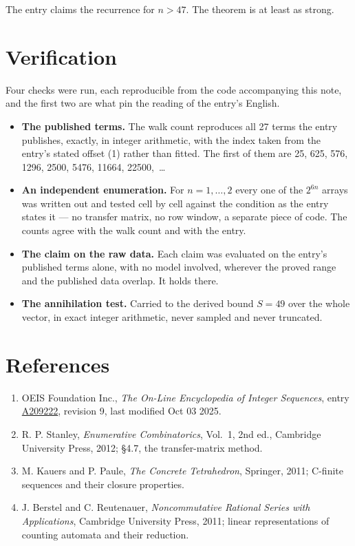 \documentclass[11pt]{article}
\theoremstyle{definition}
\begin{document}
The entry claims the recurrence for $n > 47$. The theorem is at least as strong.

\section{Verification}

Four checks were run, each reproducible from the code accompanying this note, and the first two are what pin the reading of the entry's English.

\begin{itemize}

\item {\bfseries The published terms.} The walk count reproduces all 27 terms the entry publishes, exactly, in integer arithmetic, with the index taken from the entry's stated offset (1) rather than fitted. The first of them are 25, 625, 576, 1296, 2500, 5476, 11664, 22500,~\dots

\item {\bfseries An independent enumeration.} For $n = 1,\dots,2$ every one of the $2^{6n}$ arrays was written out and tested cell by cell against the condition as the entry states it --- no transfer matrix, no row window, a separate piece of code. The counts agree with the walk count and with the entry.

\item {\bfseries The claim on the raw data.} Each claim was evaluated on the entry's published terms alone, with no model involved, wherever the proved range and the published data overlap. It holds there.

\item {\bfseries The annihilation test.} Carried to the derived bound $S = 49$ over the whole vector, in exact integer arithmetic, never sampled and never truncated.

\end{itemize}

\section{References}

\begin{enumerate}

\item OEIS Foundation Inc., \emph{The On-Line Encyclopedia of Integer Sequences}, entry \href{https://oeis.org/A209222}{A209222}, revision 9, last modified Oct 03 2025.

\item R. P. Stanley, \emph{Enumerative Combinatorics}, Vol.~1, 2nd ed., Cambridge University Press, 2012; \S4.7, the transfer-matrix method.

\item M. Kauers and P. Paule, \emph{The Concrete Tetrahedron}, Springer, 2011; C-finite sequences and their closure properties.

\item J. Berstel and C. Reutenauer, \emph{Noncommutative Rational Series with Applications}, Cambridge University Press, 2011; linear representations of counting automata and their reduction.

\end{enumerate}
\end{document}
